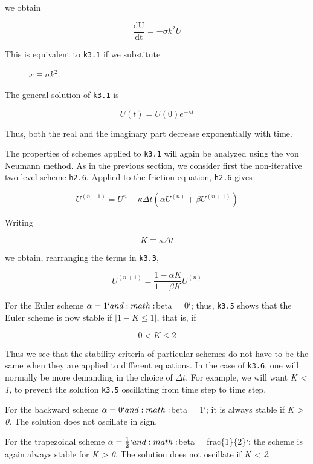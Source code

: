 we obtain

\[\frac{\text{dU}}{\text{dt}} = - \sigma k^{2}U\]

\begin{description}
    \item[This is equivalent to \texttt{k3.1} if we substitute]
    \(x \equiv \sigma k^{2}\).
\end{description}

The general solution of \texttt{k3.1} is

\[U\left( t \right) = U\left( 0 \right)e^{- \kappa t}\]

Thus, both the real and the imaginary part decrease exponentially with
time.

The properties of schemes applied to \texttt{k3.1} will again be
analyzed using the von Neumann method. As in the previous section, we
consider first the non-iterative two level scheme \texttt{h2.6}. Applied
to the friction equation, \texttt{h2.6} gives

\[U^{(n + 1)} = U^{n} - \kappa\Delta t \left( \alpha U^{( n )} + \beta U^{\left( n + 1 \right)} \right)\]

Writing

\[K \equiv \kappa \Delta t\]

we obtain, rearranging the terms in \texttt{k3.3},

\[U^{\left( n + 1 \right)} = \frac{1 - \alpha K}{1 + \beta K}U^{\left( n \right)}\]

For the Euler scheme \(\alpha = 1`and :math:\)beta = 0`; thus,
\texttt{k3.5} shows that the Euler scheme is now stable if
\(\left| 1 - K \leq 1 \right|\), that is, if

\[0 < K \leq 2\]

Thus we see that the stability criteria of particular schemes do not
have to be the same when they are applied to different equations. In the
case of \texttt{k3.6}, one will normally be more demanding in the choice
of \(\Delta t\). For example, we will want \emph{K \textless{} 1}, to
prevent the solution \texttt{k3.5} oscillating from time step to time
step.

For the backward scheme \(\alpha = 0`and :math:\)beta = 1`; it is always
stable if \emph{K \textgreater{} 0}. The solution does not oscillate in
sign.

For the trapezoidal scheme \(\alpha = \frac{1}{2}`and
:math:\)beta = frac\{1\}\{2\}`; the scheme is again always stable for
\emph{K \textgreater{} 0}. The solution does not oscillate if \emph{K
\textless{} 2}.

